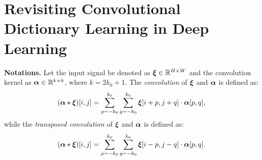         









\section{Revisiting Convolutional Dictionary Learning in Deep Learning}


\textbf{Notations.} 
Let the input signal be denoted as ${\bm{\xi}} \in \mathbb{R}^{H \times W}$ and the convolution kernel as ${\bm{\alpha}} \in \mathbb{R}^{k \times k}$, where $k = 2k_0 + 1$. The \emph{convolution} of ${\bm{\xi}}$ and ${\bm{\alpha}}$ is defined as:
\begin{equation} 
({\bm{\alpha}} \star {\bm{\xi}})[i, j] = \sum_{p=-k_0}^{k_0} \sum_{q=-k_0}^{k_0} {\bm{\xi}}[i+p, j+q] \cdot {\bm{\alpha}}[p, q], \label{eq:correlation} 
\end{equation}
while the \emph{transposed convolution} of ${\bm{\xi}}$ and ${\bm{\alpha}}$ is defined as:
\begin{equation} 
({\bm{\alpha}} * {\bm{\xi}})[i, j] = \sum_{p=-k_0}^{k_0} \sum_{q=-k_0}^{k_0} {\bm{\xi}}[i-p, j-q] \cdot {\bm{\alpha}}[p, q]. \label{eq:convolution} 
\end{equation}



